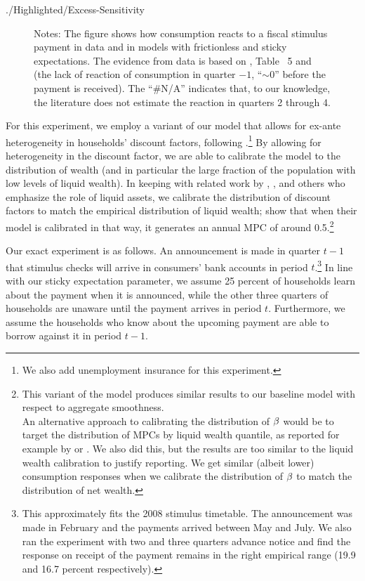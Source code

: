 \documentclass[titlepage]{./econtex}
\begin{document}
\begin{verbatimwrite}{./Highlighted/Excess-Sensitivity}
\begin{figure}
\begin{flushleft}
  \footnotesize Notes: The figure shows how consumption reacts to a fiscal stimulus payment in data and in models with frictionless and sticky expectations. The evidence from data is based on \cite{psjmMPC2008}, Table ~5 and \cite{brodaParker} (the lack of reaction of consumption in quarter $-1$, ``$\sim0$'' before the payment is received). The ``\#N/A'' indicates that, to our knowledge, the literature does not estimate the reaction in quarters 2 through 4.
  \normalsize
  \end{flushleft}
\end{figure}


For this experiment, we employ a variant of our model that allows for ex-ante heterogeneity in households' discount factors, following \cite{cstwMPC}.\footnote{We also add unemployment insurance for this experiment.} By allowing for heterogeneity in the discount factor, we are able to calibrate the model to the distribution of wealth (and in particular the large fraction of the population with low levels of liquid wealth).  In keeping with related work by \cite{kvwWealthyH2m}, \cite{kmvHANK}, and others who emphasize the role of liquid assets, we calibrate the distribution of discount factors to match the empirical distribution of liquid wealth; \cite{cstwMPC} show that when their model is calibrated in that way, it generates an annual MPC of around 0.5.\footnote{This variant of the model produces similar results to our baseline model with respect to aggregate smoothness.\\
An alternative approach to calibrating the distribution of $\beta$ would be to target the distribution of MPCs by liquid wealth quantile, as reported for example by \cite{fhnMPC} or \cite{ckConsumption}. We also did this, but the results are too similar to the liquid wealth calibration to justify reporting.  We get similar (albeit lower) consumption responses when we calibrate the distribution of $\beta$ to match the distribution of net wealth.}

Our exact experiment is as follows.  An announcement is made in quarter $t-1$ that stimulus checks will arrive in consumers' bank accounts in period $t$.\footnote{This approximately fits the 2008 stimulus timetable. The announcement was made in February and the payments arrived between May and July. We also ran the experiment with two and three quarters advance notice and find the response on receipt of the payment remains in the right empirical range (19.9 and 16.7 percent respectively).} In line with our sticky expectation parameter, we assume 25 percent of households learn about the payment when it is announced, while the other three quarters of households are unaware until the payment arrives in period $t$. Furthermore, we assume the households who know about the upcoming payment are able to borrow against it in period $t-1$.


\end{verbatimwrite}
\end{document}
